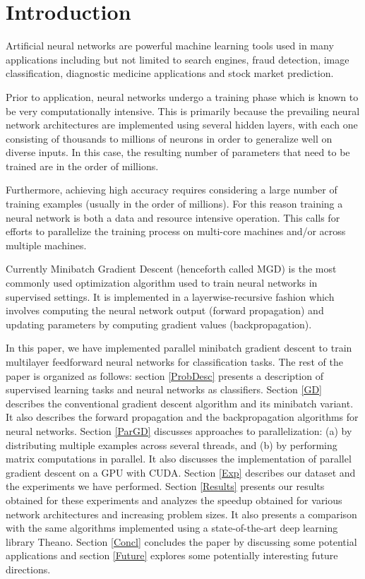 \section{Introduction}
\label{Intro}

Artificial neural networks are powerful machine learning tools used in many applications including but not limited to search engines, fraud detection, image classification, diagnostic medicine applications and stock market prediction.

Prior to application, neural networks undergo a training phase which is known to be very computationally intensive. This is primarily because the prevailing neural network architectures are implemented using several hidden layers, with each one consisting of thousands to millions of neurons in order to generalize well on diverse inputs. In this case, the resulting number of parameters that need to be trained are in the order of millions.

Furthermore, achieving high accuracy requires considering a large number of training examples (usually in the order of millions). For this reason training a neural network is both a data and resource intensive operation. This calls for efforts to parallelize the training process on multi-core machines and/or across multiple machines.

Currently Minibatch Gradient Descent (henceforth called MGD) is the most commonly used optimization algorithm used to train neural networks in supervised settings. It is implemented in a layerwise-recursive fashion which involves computing the neural network output (forward propagation) and updating parameters by computing gradient values (backpropagation).

In this paper, we have implemented parallel minibatch gradient descent to train multilayer feedforward neural networks for classification tasks.
The rest of the paper is organized as follows: section \ref{ProbDesc} presents a description of supervised learning tasks and neural networks as classifiers.
Section \ref{GD} describes the conventional gradient descent algorithm and its minibatch variant. It also describes the forward propagation and the backpropagation algorithms for neural networks.
Section \ref{ParGD} discusses approaches to parallelization: (a) by distributing multiple examples across several threads, and (b) by performing matrix computations in parallel.
It also discusses the implementation of parallel gradient descent on a GPU with CUDA.
Section \ref{Exp} describes our dataset and the experiments we have performed.
Section \ref{Results} presents our results obtained for these experiments and analyzes the speedup obtained for various network architectures and increasing problem sizes. It also presents a comparison with the same algorithms implemented using a state-of-the-art deep learning library Theano.
Section \ref{Concl} concludes the paper by discussing some potential applications and section \ref{Future} explores some potentially interesting future directions.